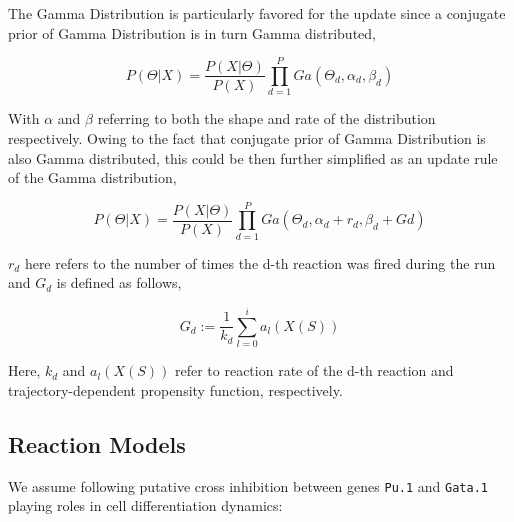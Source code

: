 \documentclass{bioinfo}
\begin{document}
The Gamma Distribution is particularly favored for the update since a conjugate prior of Gamma Distribution is in turn Gamma distributed,

\begin{equation}
P(\Theta | X) = \frac{P(X | \Theta)}{P (X)} \prod_{d=1}^{P} Ga(\Theta_d, \alpha_d, \beta_d)\label{eq:19}
\end{equation}

With $\alpha$ and $\beta$ referring to both the shape and rate of the distribution respectively. Owing to the fact that conjugate prior of Gamma Distribution is also Gamma distributed, this could be then further simplified as an update rule of the Gamma distribution,

\begin{equation}
P(\Theta | X) = \frac{P(X | \Theta)}{P (X)} \prod_{d=1}^{P} Ga(\Theta_d, \alpha_d + r_d, \beta_d + Gd)\label{eq:20}
\end{equation}

$r_d$ here refers to the number of times the d-th reaction was fired during the run and $G_d$ is defined as follows,

\begin{equation}
G_d := \frac{1}{k_d} \sum_{l=0}^{i} a_{l}(X(S))\label{eq:21}
\end{equation}

Here, $k_d$ and $a_{l}(X(S))$ refer to reaction rate of the d-th reaction and trajectory-dependent propensity function, respectively.

\subsection{Reaction Models}

We assume following putative cross inhibition between genes \texttt{Pu.1} and \texttt{Gata.1} playing roles in cell differentiation dynamics:

\begin{center}
\end{center}
\end{document}
